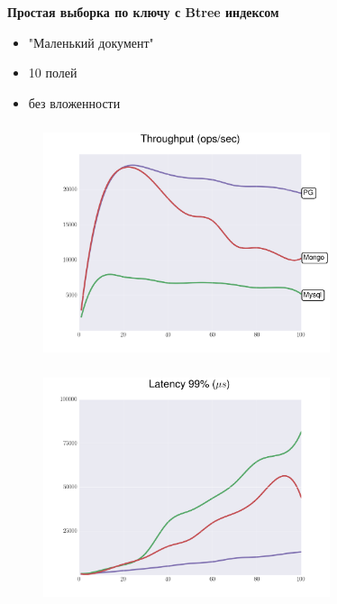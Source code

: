 \documentclass[usenames,dvipsnames, 18pt, compress, aspectratio=169]{beamer}
\begin{document}
\begin{frame}
    \frametitle{}
    \begin{center}
        \textbf{Простая выборка по ключу с Btree индексом}
        \begin{itemize}[label={}]
            \item "Маленький документ"
            \item 10 полей
            \item без вложенности
        \end{itemize}
    \end{center}
\end{frame}

\begin{frame}
    \frametitle{}
    \begin{center}
    \begin{figure}
        \includegraphics[width=0.75\textwidth,center]{benchmarks/workload_c_btree/throughput.png}
    \end{figure}
    \end{center}
\end{frame}

\begin{frame}
    \frametitle{}
    \begin{center}
    \begin{figure}
        \includegraphics[width=0.75\textwidth,center]{benchmarks/workload_c_btree/latency_99.png}
    \end{figure}
    \end{center}
\end{frame}
\end{document}
